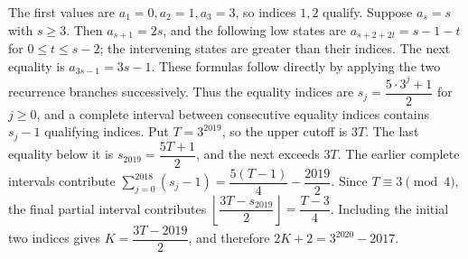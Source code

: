 The first values are $a_1=0,a_2=1,a_3=3$, so indices $1,2$ qualify. Suppose $a_s=s$ with $s\ge3$. Then $a_{s+1}=2s$, and the following low states are $a_{s+2+2t}=s-1-t$ for $0\le t\le s-2$; the intervening states are greater than their indices. The next equality is $a_{3s-1}=3s-1$. These formulas follow directly by applying the two recurrence branches successively. Thus the equality indices are $s_j=\dfrac{5\cdot3^j+1}{2}$ for $j\ge0$, and a complete interval between consecutive equality indices contains $s_j-1$ qualifying indices. Put $T=3^{2019}$, so the upper cutoff is $3T$. The last equality below it is $s_{2019}=\dfrac{5T+1}{2}$, and the next exceeds $3T$. The earlier complete intervals contribute $\sum_{j=0}^{2018}(s_j-1)=\dfrac{5(T-1)}{4}-\dfrac{2019}{2}$. Since $T\equiv3\pmod4$, the final partial interval contributes $\left\lfloor\dfrac{3T-s_{2019}}{2}\right\rfloor=\dfrac{T-3}{4}$. Including the initial two indices gives $K=\dfrac{3T-2019}{2}$, and therefore $\boxed{2K+2=3^{2020}-2017}$.
